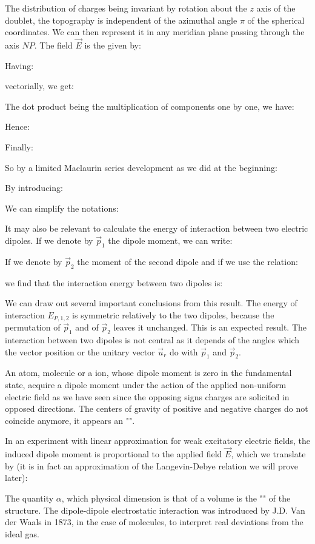 	The distribution of charges being invariant by rotation about the $z$ axis of the doublet, the topography is independent of the azimuthal angle $\pi$ of the spherical coordinates. We can then represent it in any meridian plane passing through the axis $NP$. The field $\vec{E}$ is the given by:
	
	Having:
	
	vectorially, we get:
	
	The dot product being the multiplication of components one by one, we have:
	
	Hence:
	
	Finally:
	
	So by a limited Maclaurin series development as we did at the beginning:
	
	By introducing:
	
	We can simplify the notations:
	
	It may also be relevant to calculate the energy of interaction between two electric dipoles. If we denote by $\vec{p}_1$ the dipole moment, we can write:
	
	If we denote by $\vec{p}_2$ the moment of the second dipole and if we use the relation:
	
	we find that the interaction energy between two dipoles is:
	
	We can draw out several important conclusions from this result. The energy of interaction $E_{P,1,2}$ is symmetric relatively to the two dipoles, because the permutation of $\vec{p}_1$ and of $\vec{p}_2$ leaves it unchanged. This is an expected result. The interaction between two dipoles is not central as it depends of the angles which the vector position or the unitary vector $\vec{u}_r$ do with $\vec{p}_1$ and $\vec{p}_2$.
	
	An atom, molecule or a ion, whose dipole moment is zero in the fundamental state, acquire a dipole moment under the action of the applied non-uniform electric field as we have seen since the opposing signs charges are solicited in opposed directions. The centers of gravity of positive and negative charges do not coincide anymore, it appears an "". 

	In an experiment with linear approximation for weak excitatory electric fields, the induced dipole moment is proportional to the applied field $\vec{E}$, which we translate by  (it is in fact an approximation of the Langevin-Debye relation we will prove later):
	
	The quantity $\alpha$, which physical dimension is that of a volume is the "" of the structure. The dipole-dipole electrostatic interaction was introduced by J.D. Van der Waals in 1873, in the case of molecules, to interpret real deviations from the ideal gas.
	
